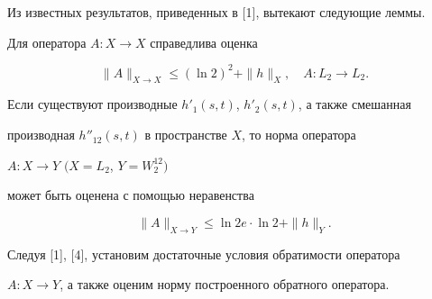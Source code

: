 Из известных результатов, приведенных в [1], вытекают следующие леммы. 


 


\begin{lem} 


Для оператора $A:X\to X$ справедлива оценка 


$$ 


\|A\|_{X\to X}\le(\ln2)^2+\|h\|_X,\quad 


A:L_2\to L_2.


$$ 


\end{lem} 


 


\begin{lem} 


Если существуют производные $h'_1(s,t)$, $h'_2(s,t)$, а также смешанная 


производная $h''_{12}(s,t)$ в пространстве $X$, то норма оператора 


$A:X\to Y$ $(X=L_2$, $Y=W^{12}_2)$ 


может быть оценена с помощью неравенства 


$$ 


\|A\|_{X\to Y}\le\ln2e\cdot\ln2+\|h\|_Y. 


$$ 


\end{lem} 


 


Следуя [1], [4], установим достаточные условия обратимости оператора 


$A:X\to Y$, а также оценим норму построенного обратного оператора. 


 


